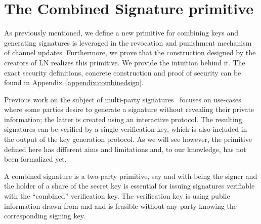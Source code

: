\section{The Combined Signature primitive}
\label{sec:ov-combined-ds}
  As previously mentioned, we define a new primitive for combining keys and
  generating signatures is leveraged in the revocation and
  punishment mechanism of channel updates. Furthermore, we prove that the
  construction designed by the creators of LN realizes this primitive. We 
  provide 
  the intuition behind it. The exact security definitions, concrete construction
  and proof of security can be found in Appendix~\ref{appendix:combinedsign}.

  Previous work on the subject of multi-party
signatures~\cite{DBLP:conf/ndss/NicolosiKDM03,DBLP:journals/iacr/BellareS01,boyd1986digital,DBLP:conf/ndss/Ganesan95a,DBLP:conf/crypto/MacKenzieR01,ganesan1994secure}
  focuses on use-cases where some parties desire to generate a signature without
  revealing their private information; the latter is created using an
  interactive protocol. The resulting signatures can be verified by a single
  verification key, which is also included in the output of the key generation
  protocol. As we will see however, the primitive defined here has different
  aims and limitations and, to our knowledge, has not been formalized yet.

  A combined signature is a two-party primitive, say  \alice{}
  and \bob\redden{,} with \bob{} being the signer and \alice{} the holder of a
  share of the secret key is essential for issuing
  signatures verifiable with the ``combined''
  verification key. The verification key is  using public
  information drawn from \alice{} and \bob{} and is feasible without any party
  knowing the corresponding signing key. 

